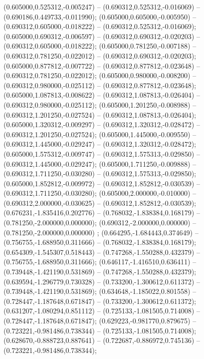  (0.605000,0.525312,-0.005247) -- (0.690312,0.525312,-0.016069) -- (0.690186,0.449733,-0.011990);
 (0.605000,0.605000,-0.005950) -- (0.690312,0.605000,-0.018222) -- (0.690312,0.525312,-0.016069);
 (0.605000,0.690312,-0.006597) -- (0.690312,0.690312,-0.020203) -- (0.690312,0.605000,-0.018222);
 (0.605000,0.781250,-0.007188) -- (0.690312,0.781250,-0.022012) -- (0.690312,0.690312,-0.020203);
 (0.605000,0.877812,-0.007722) -- (0.690312,0.877812,-0.023648) -- (0.690312,0.781250,-0.022012);
 (0.605000,0.980000,-0.008200) -- (0.690312,0.980000,-0.025112) -- (0.690312,0.877812,-0.023648);
 (0.605000,1.087813,-0.008622) -- (0.690312,1.087813,-0.026404) -- (0.690312,0.980000,-0.025112);
 (0.605000,1.201250,-0.008988) -- (0.690312,1.201250,-0.027524) -- (0.690312,1.087813,-0.026404);
 (0.605000,1.320312,-0.009297) -- (0.690312,1.320312,-0.028472) -- (0.690312,1.201250,-0.027524);
 (0.605000,1.445000,-0.009550) -- (0.690312,1.445000,-0.029247) -- (0.690312,1.320312,-0.028472);
 (0.605000,1.575312,-0.009747) -- (0.690312,1.575313,-0.029850) -- (0.690312,1.445000,-0.029247);
 (0.605000,1.711250,-0.009888) -- (0.690312,1.711250,-0.030280) -- (0.690312,1.575313,-0.029850);
 (0.605000,1.852812,-0.009972) -- (0.690312,1.852812,-0.030539) -- (0.690312,1.711250,-0.030280);
 (0.605000,2.000000,-0.010000) -- (0.690312,2.000000,-0.030625) -- (0.690312,1.852812,-0.030539);
 (0.676231,-1.835416,0.202776) -- (0.768032,-1.838384,0.168179) -- (0.781250,-2.000000,0.000000);
 (0.690312,-2.000000,0.000000) -- (0.781250,-2.000000,0.000000) ;
 (0.664295,-1.684443,0.374649) -- (0.756755,-1.688950,0.311666) -- (0.768032,-1.838384,0.168179);
 (0.654309,-1.545307,0.518443) -- (0.747268,-1.550288,0.432379) -- (0.756755,-1.688950,0.311666);
 (0.646117,-1.416510,0.636411) -- (0.739448,-1.421190,0.531869) -- (0.747268,-1.550288,0.432379);
 (0.639594,-1.296779,0.730328) -- (0.733200,-1.300612,0.611372) -- (0.739448,-1.421190,0.531869);
 (0.634648,-1.185022,0.801558) -- (0.728447,-1.187648,0.671847) -- (0.733200,-1.300612,0.611372);
 (0.631207,-1.080294,0.851112) -- (0.725133,-1.081505,0.714008) -- (0.728447,-1.187648,0.671847);
 (0.629223,-0.981770,0.879675) -- (0.723221,-0.981486,0.738344) -- (0.725133,-1.081505,0.714008);
 (0.628670,-0.888723,0.887641) -- (0.722687,-0.886972,0.745136) -- (0.723221,-0.981486,0.738344);
